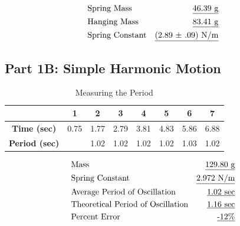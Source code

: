 \documentclass[twocolumn,english]{IEEEtran}
\theoremstyle{plain}
\theoremstyle{plain}
\begin{document}
  \begin{align*}
  &\text{Spring Mass} 			&\text{\underline{46.39 g}} \\
  &\text{Hanging Mass} 			&\text{\underline{83.41 g}} \\
  &\text{Spring Constant} 		&\text{\underline{(2.89 $\pm$ .09) N/m}} \\
\end{align*}

\subsection*{\textbf{Part 1B: Simple Harmonic Motion}}
\begin{table}[h]
  \label{tb:data_period}
  \caption{Measuring the Period}
  \centering{}
  \begin{tabular}{|c|c|c|c|c|c|c|c|}
  \hline
  \textbf{}             & 1    & 2    & 3    & 4    & 5    & 6    & 7    \\ \hline
  \textbf{Time (sec)}   & 0.75 & 1.77 & 2.79 & 3.81 & 4.83 & 5.86 & 6.88 \\ \hline
  \textbf{Period (sec)} &      & 1.02 & 1.02 & 1.02 & 1.02 & 1.03 & 1.02 \\ \hline
  \end{tabular}
\end{table}

\begin{align*}
  &\text{Mass} 						&\text{\underline{129.80 g}} \\
  &\text{Spring Constant} 				&\text{\underline{2.972 N/m}} \\
  &\text{Average Period of Oscillation} 		&\text{\underline{1.02 sec}} \\
  &\text{Theoretical Period of Oscillation} 		&\text{\underline{1.16 sec}} \\
  &\text{Percent Error} 				&\text{\underline{-12\%}} \\
\end{align*}
\end{document}
